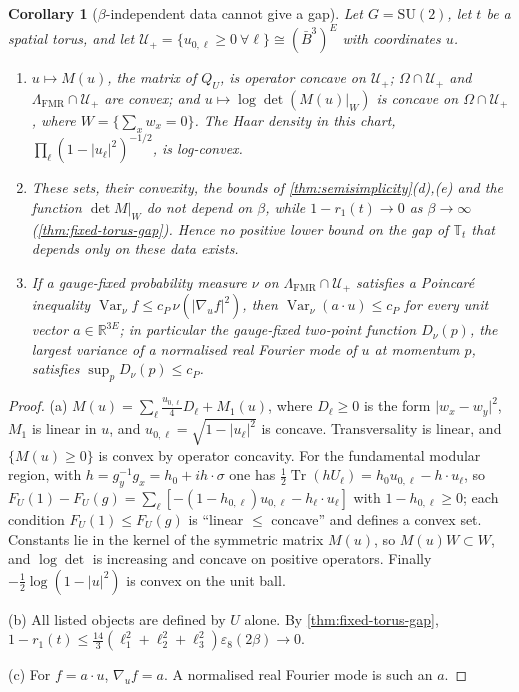 \documentclass[11pt,a4paper]{amsart}
\newtheorem{corollary}[theorem]{Corollary}
\theoremstyle{definition}
\theoremstyle{remark}
\numberwithin{equation}{section}
\DeclareMathOperator{\Tr}{Tr}        %
\DeclareMathOperator{\Var}{Var}      %
\newcommand{\R}{\mathbb{R}}          %
\newcommand{\abs}[1]{\lvert #1\rvert}      %
\newcommand{\SU}{\mathrm{SU}}              %
\newcommand{\TT}{\mathbb{T}}               %
\begin{document}
\begin{corollary}[$\beta$-independent data cannot give a gap]\label{cor:beta-independent}
Let $G=\SU(2)$, let $t$ be a spatial torus, and let $\mathcal U_+=\{u_{0,\ell}\ge0\ \forall\ell\}\cong(\bar B^3)^E$ with coordinates $u$.
\begin{enumerate}[label=\textup{(\alph*)},leftmargin=*]
\item $u\mapsto M(u)$, the matrix of $Q_U$, is operator concave on $\mathcal U_+$; $\Omega\cap\mathcal U_+$ and $\Lambda_{\mathrm{FMR}}\cap\mathcal U_+$ are convex; and $u\mapsto\log\det(M(u)|_W)$ is concave on $\Omega\cap\mathcal U_+$, where $W=\{\sum_xw_x=0\}$. The Haar density in this chart, $\prod_\ell(1-\abs{u_\ell}^2)^{-1/2}$, is log-convex.
\item These sets, their convexity, the bounds of \cref{thm:semisimplicity}(d),(e) and the function $\det M|_W$ do not depend on $\beta$, while $1-r_1(t)\to0$ as $\beta\to\infty$ (\cref{thm:fixed-torus-gap}). Hence no positive lower bound on the gap of $\TT_t$ that depends only on these data exists.
\item If a gauge-fixed probability measure $\nu$ on $\Lambda_{\mathrm{FMR}}\cap\mathcal U_+$ satisfies a Poincar\'e inequality $\Var_\nu f\le c_P\,\nu(\abs{\nabla_uf}^2)$, then $\Var_\nu(a\cdot u)\le c_P$ for every unit vector $a\in\R^{3E}$; in particular the gauge-fixed two-point function $D_\nu(p)$, the largest variance of a normalised real Fourier mode of $u$ at momentum $p$, satisfies $\sup_pD_\nu(p)\le c_P$.
\end{enumerate}
\end{corollary}

\begin{proof}
(a) $M(u)=\sum_\ell\frac{u_{0,\ell}}4D_\ell+M_1(u)$, where $D_\ell\ge0$ is the form $\abs{w_x-w_y}^2$, $M_1$ is linear in $u$, and $u_{0,\ell}=\sqrt{1-\abs{u_\ell}^2}$ is concave. Transversality is linear, and $\{M(u)\ge0\}$ is convex by operator concavity. For the fundamental modular region, with $h=g_y^{-1}g_x=h_0+ih\cdot\sigma$ one has $\frac12\Tr(hU_\ell)=h_0u_{0,\ell}-h\cdot u_\ell$, so $F_U(1)-F_U(g)=\sum_\ell[-(1-h_{0,\ell})u_{0,\ell}-h_\ell\cdot u_\ell]$ with $1-h_{0,\ell}\ge0$; each condition $F_U(1)\le F_U(g)$ is ``linear $\le$ concave'' and defines a convex set. Constants lie in the kernel of the symmetric matrix $M(u)$, so $M(u)W\subset W$, and $\log\det$ is increasing and concave on positive operators. Finally $-\frac12\log(1-\abs u^2)$ is convex on the unit ball.

(b) All listed objects are defined by $U$ alone. By \cref{thm:fixed-torus-gap}, $1-r_1(t)\le\frac{14}3(\ell_1^2+\ell_2^2+\ell_3^2)\varepsilon_8(2\beta)\to0$.

(c) For $f=a\cdot u$, $\nabla_uf=a$. A normalised real Fourier mode is such an $a$.
\end{proof}
\end{document}
